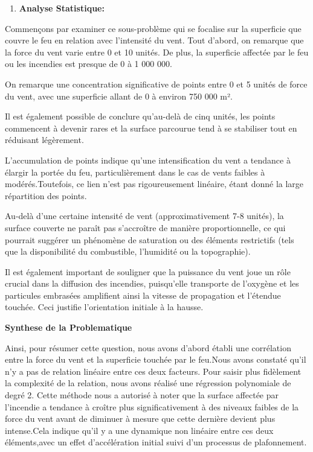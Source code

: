 \documentclass[
]{article}
\providecommand{\tightlist}{%
  \setlength{\itemsep}{0pt}\setlength{\parskip}{0pt}}
\begin{document}
\begin{enumerate}
\def\labelenumi{\arabic{enumi}.}
\setcounter{enumi}{1}
\tightlist
\item
  \textbf{Analyse Statistique:}
\end{enumerate}

Commençons par examiner ce sous-problème qui se focalise sur la
superficie que couvre le feu en relation avec l'intensité du vent. Tout
d'abord, on remarque que la force du vent varie entre 0 et 10 unités. De
plus, la superficie affectée par le feu ou les incendies est presque de
0 à 1 000 000.

On remarque une concentration significative de points entre 0 et 5
unités de force du vent, avec une superficie allant de 0 à environ 750
000 m².

Il est également possible de conclure qu'au-delà de cinq unités, les
points commencent à devenir rares et la surface parcourue tend à se
stabiliser tout en réduisant légèrement.

L'accumulation de points indique qu'une intensification du vent a
tendance à élargir la portée du feu, particulièrement dans le cas de
vents faibles à modérés.Toutefois, ce lien n'est pas rigoureusement
linéaire, étant donné la large répartition des points.

Au-delà d'une certaine intensité de vent (approximativement 7-8 unités),
la surface couverte ne paraît pas s'accroître de manière
proportionnelle, ce qui pourrait suggérer un phénomène de saturation ou
des éléments restrictifs (tels que la disponibilité du combustible,
l'humidité ou la topographie).

Il est également important de souligner que la puissance du vent joue un
rôle crucial dans la diffusion des incendies, puisqu'elle transporte de
l'oxygène et les particules embrasées amplifient ainsi la vitesse de
propagation et l'étendue touchée. Ceci justifie l'orientation initiale à
la hausse.

\textbf{Synthese de la Problematique}

Ainsi, pour résumer cette question, nous avons d'abord établi une
corrélation entre la force du vent et la superficie touchée par le
feu.Nous avons constaté qu'il n'y a pas de relation linéaire entre ces
deux facteurs. Pour saisir plus fidèlement la complexité de la relation,
nous avons réalisé une régression polynomiale de degré 2. Cette méthode
nous a autorisé à noter que la surface affectée par l'incendie a
tendance à croître plus significativement à des niveaux faibles de la
force du vent avant de diminuer à mesure que cette dernière devient plus
intense.Cela indique qu'il y a une dynamique non linéaire entre ces deux
éléments,avec un effet d'accélération initial suivi d'un processus de
plafonnement.
\end{document}

